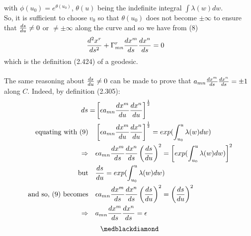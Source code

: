 with $\phi (u_0) =  e^{\theta(u_0)}$, $\theta(u)$ being the indefinite integral $\int \lambda (w)dw $.\\
So, it is sufficient to choose $v_0$ so that $\theta(u_0)$ does not become  $\pm \infty$ to ensure that $\dv{s}{u} \ne 0$ or $ \ne \pm \infty$ along the curve and so we have from (8)
\begin{align}
\dv[2]{x^r}{s} +\Gamma^r_{mn}\dv{x^m}{s}\dv{x^n}{s}  &=  0\end{align}
which is the definition (2.424) of a geodesic.\\\\
The same reasoning about $\dv{s}{u} \ne 0$ can be made to prove that $a_{mn}\dv{x^m}{s}\dv{x^n}{s} = \pm1$ along $C$. Indeed, by definition (2.305):
\begin{align}
\ ds = &\left[ \epsilon a_{mn}\dv{x^m}{u}\dv{x^n}{u}\right]^\frac{1}{2}\\
\text{ equating with (9)} \quad   &\left[ \epsilon a_{mn}\dv{x^m}{u}\dv{x^n}{u}\right]^\frac{1}{2} =                 exp(\int_{u_0}^u \lambda (w)dw)\\
\Rightarrow \quad &\epsilon a_{mn}\dv{x^m}{s}\dv{x^n}{s}\left (\dv{s}{u}\right )^2 =  \left[ exp(\int_{u_0}^u \lambda (w)dw) \right]^2\\
\text{but} \quad &\dv{s}{u} = exp(\int_{u_0}^u \lambda (w)dw)\\
\text{ and so, (9) becomes} \quad &\epsilon a_{mn}\dv{x^m}{s}\dv{x^n}{s}\left (\dv{s}{u}\right )^2 =  \left (\dv{s}{u}\right )^2\\
\Rightarrow \quad & a_{mn}\dv{x^m}{s}\dv{x^n}{s}=\epsilon
\end{align}
$$\medblackdiamond$$
\newpage



